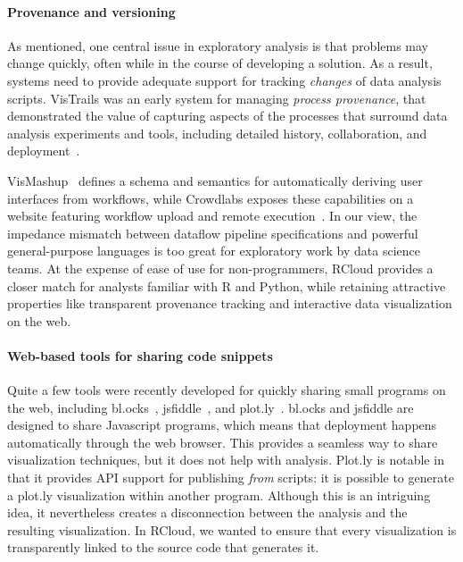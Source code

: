 \paragraph*{Provenance and versioning} As
mentioned, one central issue in exploratory analysis is that
problems may change quickly, often while in the course of
developing a solution. As a result, systems need to provide adequate
support for tracking \emph{changes} of data analysis scripts. VisTrails
was an early system for managing \emph{process provenance},
that demonstrated the value of capturing aspects of the processes
that surround data analysis experiments and tools, including detailed
history, collaboration, and deployment~\cite{Callahan:2006:VVM}.

VisMashup~\cite{Santos:2009:VST} defines a schema and
semantics for automatically deriving user interfaces from workflows,
while Crowdlabs exposes these capabilities on a website
featuring workflow upload and remote execution~\cite{Mates:2011:CSA}.
In our view, the impedance mismatch between dataflow pipeline
specifications and powerful general-purpose languages is too great
for exploratory work by data science teams. At the
expense of ease of use for non-programmers, RCloud provides
a closer match for analysts familiar with R and Python,
while retaining attractive properties like transparent
provenance tracking and interactive data visualization on the web.

\paragraph*{Web-based tools for sharing code snippets}
Quite a few tools were recently developed for quickly
sharing small programs on the web, including
bl.ocks~\cite{blocks}, jsfiddle~\cite{jsfiddle}, and
plot.ly~\cite{plotly}. bl.ocks and jsfiddle are designed to
share Javascript programs, which means that deployment happens
automatically through the web browser. This provides a seamless
way to share visualization techniques, but it does not help with
analysis.
Plot.ly is notable in that it
provides API support for publishing \emph{from} scripts: 
it is possible to generate a plot.ly visualization within
another program. Although this is an intriguing idea, it
nevertheless creates a disconnection between the analysis and the
resulting visualization. In RCloud, we wanted to ensure that every
visualization is transparently linked to the source code that
generates it.

